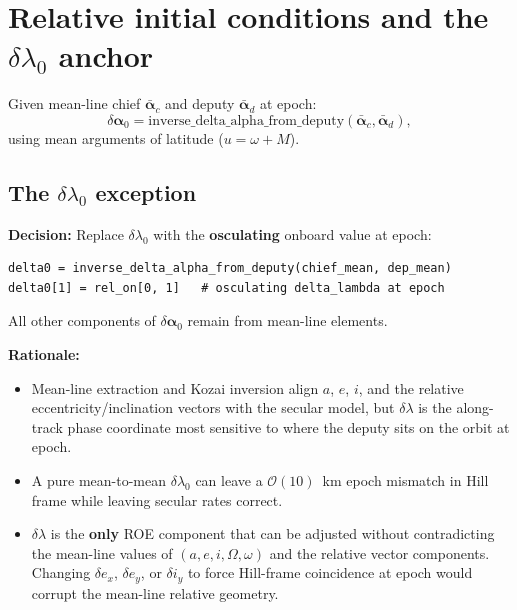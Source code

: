\documentclass[11pt]{article}
\begin{document}
\section{Relative initial conditions and the $\delta\lambda_0$ anchor}

Given mean-line chief $\bar{\bm{\alpha}}_c$ and deputy $\bar{\bm{\alpha}}_d$ at epoch:
\begin{equation}
\delta\bm{\alpha}_0 = \text{inverse\_delta\_alpha\_from\_deputy}(\bar{\bm{\alpha}}_c, \bar{\bm{\alpha}}_d),
\end{equation}
using mean arguments of latitude ($u = \omega + M$).

\subsection{The $\delta\lambda_0$ exception}

\textbf{Decision:} Replace $\delta\lambda_0$ with the \textbf{osculating} onboard value at epoch:
\begin{verbatim}
delta0 = inverse_delta_alpha_from_deputy(chief_mean, dep_mean)
delta0[1] = rel_on[0, 1]   # osculating delta_lambda at epoch
\end{verbatim}

All other components of $\delta\bm{\alpha}_0$ remain from mean-line elements.

\textbf{Rationale:}
\begin{itemize}
    \item Mean-line extraction and Kozai inversion align $a$, $e$, $i$, and the relative eccentricity/inclination vectors with the secular model, but $\delta\lambda$ is the along-track phase coordinate most sensitive to where the deputy sits on the orbit at epoch.
    \item A pure mean-to-mean $\delta\lambda_0$ can leave a $\mathcal{O}(10)$~km epoch mismatch in Hill frame while leaving secular rates correct.
    \item $\delta\lambda$ is the \textbf{only} ROE component that can be adjusted without contradicting the mean-line values of $(a,e,i,\Omega,\omega)$ and the relative vector components. Changing $\delta e_x$, $\delta e_y$, or $\delta i_y$ to force Hill-frame coincidence at epoch would corrupt the mean-line relative geometry.
\end{itemize}
\end{document}
